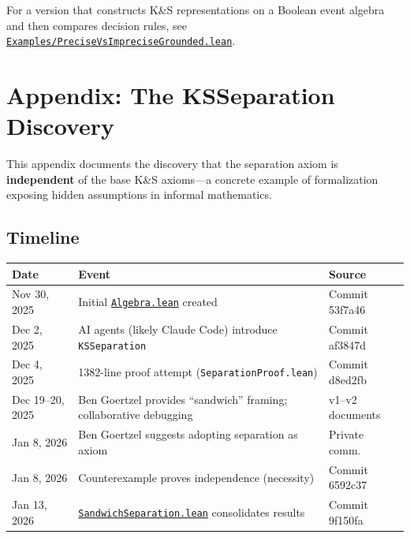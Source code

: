 \documentclass[11pt]{article}
\theoremstyle{definition}
\theoremstyle{remark}
\begin{document}
For a version that constructs K\&S representations on a Boolean event algebra and then compares
decision rules, see \href{https://github.com/zariuq/ks-foundations-of-inference/blob/main/KnuthSkilling/Examples/PreciseVsImpreciseGrounded.lean}{\texttt{Examples/PreciseVsImpreciseGrounded.lean}}.

\section*{Appendix: The KSSeparation Discovery}
\label{app:separation-history}

This appendix documents the discovery that the separation axiom is \textbf{independent} of the
base K\&S axioms---a concrete example of formalization exposing hidden assumptions in informal
mathematics.

\subsection*{Timeline}

\begin{center}
\begin{tabular}{lll}
\toprule
\textbf{Date} & \textbf{Event} & \textbf{Source} \\
\midrule
Nov 30, 2025 & Initial \href{https://github.com/zariuq/ks-foundations-of-inference/blob/main/KnuthSkilling/Core/Algebra.lean}{\texttt{Algebra.lean}} created & Commit 53f7a46 \\
Dec 2, 2025 & AI agents (likely Claude Code) introduce \texttt{KSSeparation} & Commit af3847d \\
Dec 4, 2025 & 1382-line proof attempt (\texttt{SeparationProof.lean}) & Commit d8ed2fb \\
Dec 19--20, 2025 & Ben Goertzel provides ``sandwich'' framing; collaborative debugging & v1--v2 documents \\
Jan 8, 2026 & Ben Goertzel suggests adopting separation as axiom & Private comm. \\
Jan 8, 2026 & Counterexample proves independence (necessity) & Commit 6592c37 \\
Jan 13, 2026 & \href{https://github.com/zariuq/ks-foundations-of-inference/blob/main/KnuthSkilling/Additive/Axioms/SandwichSeparation.lean}{\texttt{SandwichSeparation.lean}} consolidates results & Commit 9f150fa \\
\bottomrule
\end{tabular}
\end{center}
\end{document}
